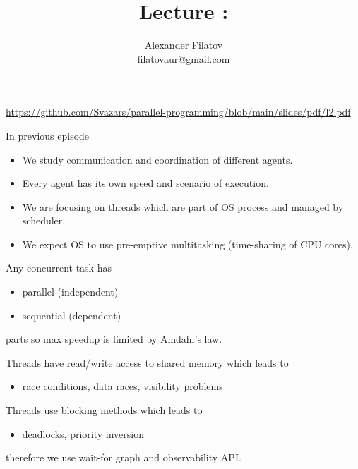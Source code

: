 


\title[]{Lecture \basicNum: \basicTopic}
\subtitle[]{\basicKey}
\author[]{Alexander Filatov\\ filatovaur@gmail.com}

\date{}


\newcommand{\taskAsyncException}{2.1}
\newcommand{\taskEmpire}{2.2}
\newcommand{\taskCodeDining}{2.3}
\newcommand{\taskEmpireCond}{2.4}




\begin{frame}
  \titlepage
    \url{https://github.com/Svazars/parallel-programming/blob/main/slides/pdf/l2.pdf}
\end{frame}

\begin{frame}{In previous episode}

\begin{itemize}
 \item We study communication and coordination of different agents.
 \item Every agent has its own speed and scenario of execution.
 \item We are focusing on threads which are part of OS process and managed by scheduler.
 \item We expect OS to use pre-emptive multitasking (time-sharing of CPU cores).
\end{itemize}

Any concurrent task has
\begin{itemize}
    \item parallel (independent)
    \item sequential (dependent)
\end{itemize}
parts so max speedup is limited by Amdahl's law.

Threads have read/write access to shared memory which leads to
\begin{itemize}
    \item race conditions, data races, visibility problems
\end{itemize}

Threads use blocking methods which leads to
\begin{itemize}
    \item deadlocks, priority inversion
\end{itemize}
therefore we use wait-for graph and observability API.
\end{frame}

